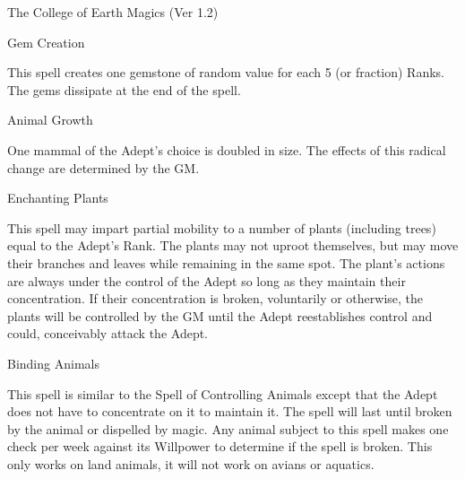 \begin{Chapter}{The College of Earth Magics (Ver 1.2)}
\begin{spell}[S-6]{Gem Creation}

\begin{effects}
This spell creates one gemstone of random value for each 5 (or
fraction) Ranks.  The gems dissipate at the end of the spell.
\end{effects}
\end{spell}

\begin{spell}[S-7]{Animal Growth}

\begin{effects}
One mammal of the Adept’s choice is doubled in size.  The effects of
this radical change are determined by the GM.

\end{effects}
\end{spell}

\begin{spell}[S-8]{Enchanting Plants}

\begin{effects}
This spell may impart partial mobility to a number of plants
(including trees) equal to the Adept’s Rank.  The plants may not
uproot themselves, but may move their branches and leaves while
remaining in the same spot.  The plant’s actions are always under the
control of the Adept so long as they maintain their concentration.  If
their concentration is broken, voluntarily or otherwise, the plants
will be controlled by the GM until the Adept reestablishes control and
could, conceivably attack the Adept.

\end{effects}
\end{spell}

\begin{spell}[S-9]{Binding Animals}

\begin{effects}
This spell is similar to the Spell of Controlling Animals except that
the Adept does not have to concentrate on it to maintain it.  The
spell will last until broken by the animal or dispelled by magic. Any
animal subject to this spell makes one check per week against its
Willpower to determine if the spell is broken.  This only works on
land animals, it will not work on avians or aquatics.


\end{effects}
\end{spell}
\end{Chapter}
